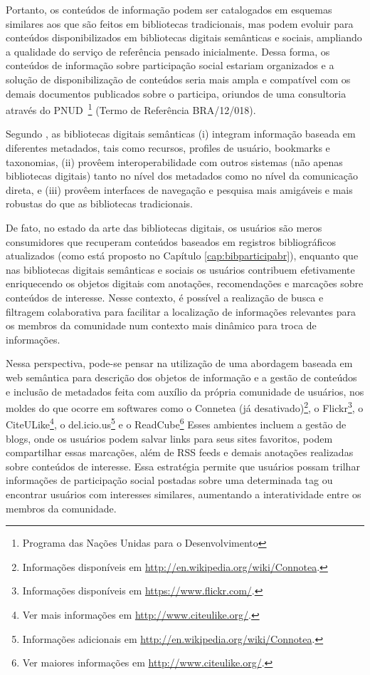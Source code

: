 Portanto, os conteúdos de informação podem ser catalogados em esquemas similares aos que são feitos em bibliotecas tradicionais, mas podem evoluir para conteúdos disponibilizados em bibliotecas digitais semânticas e sociais, ampliando a qualidade do serviço de referência pensado inicialmente. Dessa forma, os conteúdos de informação sobre participação social estariam organizados e a solução de disponibilização de conteúdos seria mais ampla e compatível com os demais documentos publicados sobre o participa, oriundos de uma consultoria através do PNUD~\footnote{Programa das Nações Unidas para o Desenvolvimento} (Termo de Referência BRA/12/018).

Segundo \cite{kruk2008semantic}, as bibliotecas digitais semânticas (i) integram informação baseada em diferentes metadados, tais como recursos, profiles de usuário, bookmarks e taxonomias, (ii) provêem interoperabilidade com outros sistemas (não apenas bibliotecas digitais) tanto no nível dos metadados como no nível da comunicação direta, e (iii) provêem interfaces de navegação e pesquisa  mais amigáveis e mais robustas do que as bibliotecas tradicionais.

De fato, no estado da arte das bibliotecas digitais, os usuários são meros consumidores que recuperam conteúdos baseados em registros bibliográficos atualizados (como está proposto no Capítulo \ref{cap:bibparticipabr}), enquanto que nas bibliotecas digitais semânticas e sociais os usuários contribuem efetivamente enriquecendo os objetos digitais com anotações, recomendações e marcações sobre conteúdos de interesse. Nesse contexto, é possível a realização de busca e filtragem colaborativa para facilitar a localização de informações relevantes para os membros da comunidade num contexto mais dinâmico para troca de informações.

Nessa perspectiva, pode-se pensar na utilização de uma abordagem baseada em web semântica para descrição dos objetos de informação e a gestão de conteúdos e inclusão de metadados feita com auxílio da própria comunidade de usuários, nos moldes do que ocorre em softwares como o Connetea (já desativado)\footnote{Informações disponíveis em \url{http://en.wikipedia.org/wiki/Connotea}.}, o Flickr\footnote{Informações disponíveis em \url{https://www.flickr.com/}.}, o CiteULike\footnote{Ver mais informações em \url{http://www.citeulike.org/}.}, o del.icio.us\footnote{Informações adicionais em \url{http://en.wikipedia.org/wiki/Connotea}.} e o ReadCube\footnote{Ver maiores informações em \url{http://www.citeulike.org/}.} Esses ambientes incluem a gestão de blogs, onde os usuários podem salvar links para seus sites favoritos, podem compartilhar essas marcações, além de RSS feeds e demais anotações realizadas sobre conteúdos de interesse. Essa estratégia permite que  usuários possam trilhar informações de participação social postadas sobre uma determinada tag ou encontrar usuários com interesses similares, aumentando a interatividade entre os membros da comunidade.

